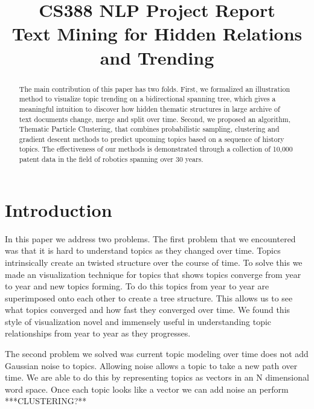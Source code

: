 \documentclass[conference]{IEEEtran}
\begin{document}
\title{\large{CS388 NLP Project Report}\\ \huge{Text Mining for Hidden Relations and Trending}}

\author{
\and
{}
}
\maketitle
\onehalfspace
\begin{abstract}
The main contribution of this paper has two folds. First, we formalized an illustration method to visualize topic trending on a bidirectional spanning tree, which gives a meaningful intuition to discover how hidden thematic structures in large archive of text documents change, merge and split over time. Second, we proposed an algorithm, Thematic Particle Clustering, that combines probabilistic sampling, clustering and gradient descent methods to predict upcoming topics based on a sequence of history topics. The effectiveness of our methods is demonstrated through a collection of 10,000 patent data in the field of robotics spanning over 30 years.
\end{abstract}

\section{Introduction}
In this paper we address two problems. The first problem that we encountered was that it is hard to understand topics as they changed over time. Topics intrinsically create an twisted structure over the course of time. To solve this we made an visualization technique for topics that shows topics converge from year to year and new topics forming. To do this topics from year to year are superimposed onto each other to create a tree structure. This allows us to see what topics converged and how fast they converged over time. We found this style of visualization novel and immensely useful in understanding topic relationships from year to year as they progresses. 

The second problem we solved was current topic modeling over time does not add Gaussian noise to topics. Allowing noise allows a topic to take a new path over time. We are able to do this by representing topics as vectors in an N dimensional word space. Once each topic looks like a vector we can add noise an perform  ***CLUSTERING?** 
\end{document}
